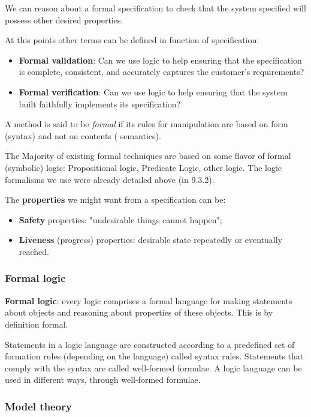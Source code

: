 \documentclass[a4paper,11pt]{article}
\begin{document}
We can reason about a formal specification to check that the system
specified will possess other desired properties.

\par\smallskip

At this points other terms can be defined in function of specification:
\begin{itemize}
	\item \textbf{Formal validation}: Can we use logic to help ensuring that
the specification is complete, consistent, and accurately
captures the customer’s requirements?
	\item \textbf{Formal verification}: Can we use logic to help ensuring that
the system built faithfully implements its specification?
\end{itemize}

A method is said to be \textit{formal} if its rules for manipulation are based on
form (syntax) and not on contents ( semantics).

The Majority of existing formal techniques are based on some
flavor of formal (symbolic) logic: Propositional logic, Predicate
Logic, other logic.
The logic formalisms we use were already detailed above (in 9.3.2).

The \textbf{properties} we might want from a specification can be:
\begin{itemize}
	\item \textbf{Safety} properties: "undesirable things cannot happen";
	\item \textbf{Liveness} (progress) properties: desirable state repeatedly or eventually reached.
\end{itemize}

\subsubsection{Formal logic}

\textbf{Formal logic}: every logic comprises a formal language for making statements about
objects and reasoning about properties of these objects.
This is by definition formal.

Statements in a logic language are constructed according to a
predefined set of formation rules (depending on the language) called
syntax rules.
Statements that comply with the syntax are called well-formed
formulae.
A logic language can be used in different ways, through well-formed formulae.

\subsubsection{Model theory}
\end{document}
